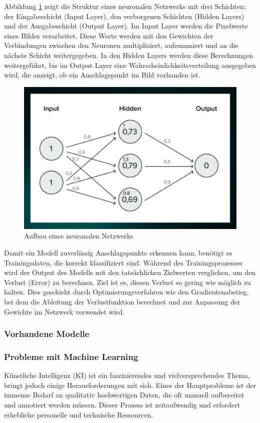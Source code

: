 Abbildung \ref{fig:network} zeigt die Struktur eines neuronalen Netzwerks mit drei Schichten: der Eingabeschicht (Input Layer), 
den verborgenen Schichten (Hidden Layers) und der Ausgabeschicht (Output Layer). Im Input Layer werden die Pixelwerte 
eines Bildes verarbeitet. Diese Werte werden mit den Gewichten der Verbindungen zwischen den Neuronen multipliziert, 
aufsummiert und an die nächste Schicht weitergegeben. In den Hidden Layers werden diese Berechnungen weitergeführt, 
bis im Output Layer eine Wahrscheinlichkeitsverteilung ausgegeben wird, die anzeigt, ob ein Anschlagspunkt im Bild 
vorhanden ist.

\begin{figure}[H]
    \centering
    \includegraphics[width=0.5\linewidth]{graphics/network.png}
    \caption{Aufbau eines neuronalen Netzwerks}
    \label{fig:network}
\end{figure}

Damit ein Modell zuverlässig Anschlagspunkte erkennen kann, benötigt es Trainingsdaten, die korrekt klassifiziert sind. 
Während des Trainingsprozesses wird der Output des Modells mit den tatsächlichen Zielwerten verglichen, um den Verlust (Error) 
zu berechnen. Ziel ist es, diesen Verlust so gering wie möglich zu halten. Dies geschieht durch Optimierungsverfahren wie den 
Gradientenabstieg, bei dem die Ableitung der Verlustfunktion berechnet und zur Anpassung der Gewichte im Netzwerk verwendet wird.


\subsubsection{Vorhandene Modelle}


\subsubsection{Probleme mit Machine Learning}
Künstliche Intelligenz (KI) ist ein faszinierendes und vielversprechendes Thema, bringt 
jedoch einige Herausforderungen mit sich. Eines der Hauptprobleme ist der immense Bedarf 
an qualitativ hochwertigen Daten, die oft manuell aufbereitet und annotiert werden müssen. 
Dieser Prozess ist zeitaufwendig und erfordert erhebliche personelle und technische Ressourcen.


